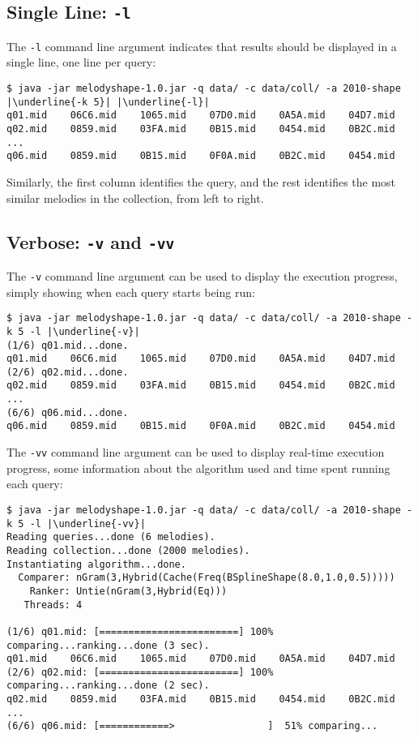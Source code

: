 \documentclass[twoside]{article}
\begin{document}
\subsection{Single Line: \texttt{-l}}

The \texttt{-l} command line argument indicates that results should be displayed in a single line, one line per query:
\begin{lstlisting}
$ java -jar melodyshape-1.0.jar -q data/ -c data/coll/ -a 2010-shape |\underline{-k 5}| |\underline{-l}|
q01.mid    06C6.mid    1065.mid    07D0.mid    0A5A.mid    04D7.mid
q02.mid    0859.mid    03FA.mid    0B15.mid    0454.mid    0B2C.mid
...
q06.mid    0859.mid    0B15.mid    0F0A.mid    0B2C.mid    0454.mid
\end{lstlisting}

Similarly, the first column identifies the query, and the rest identifies the most similar melodies in the collection, from left to right.

\subsection{Verbose: \texttt{-v} and \texttt{-vv}}

The \texttt{-v} command line argument can be used to display the execution progress, simply showing when each query starts being run:
\begin{lstlisting}
$ java -jar melodyshape-1.0.jar -q data/ -c data/coll/ -a 2010-shape -k 5 -l |\underline{-v}|
(1/6) q01.mid...done.
q01.mid    06C6.mid    1065.mid    07D0.mid    0A5A.mid    04D7.mid
(2/6) q02.mid...done.
q02.mid    0859.mid    03FA.mid    0B15.mid    0454.mid    0B2C.mid
...
(6/6) q06.mid...done.
q06.mid    0859.mid    0B15.mid    0F0A.mid    0B2C.mid    0454.mid
\end{lstlisting}

The \texttt{-vv} command line argument can be used to display real-time execution progress, some information about the algorithm used and time spent running each query:
\begin{lstlisting}
$ java -jar melodyshape-1.0.jar -q data/ -c data/coll/ -a 2010-shape -k 5 -l |\underline{-vv}|
Reading queries...done (6 melodies).
Reading collection...done (2000 melodies).
Instantiating algorithm...done.
  Comparer: nGram(3,Hybrid(Cache(Freq(BSplineShape(8.0,1.0,0.5)))))
    Ranker: Untie(nGram(3,Hybrid(Eq)))
   Threads: 4
 
(1/6) q01.mid: [========================] 100% comparing...ranking...done (3 sec).
q01.mid    06C6.mid    1065.mid    07D0.mid    0A5A.mid    04D7.mid
(2/6) q02.mid: [========================] 100% comparing...ranking...done (2 sec).
q02.mid    0859.mid    03FA.mid    0B15.mid    0454.mid    0B2C.mid
...
(6/6) q06.mid: [============>                ]  51% comparing...
\end{lstlisting}
\end{document}

